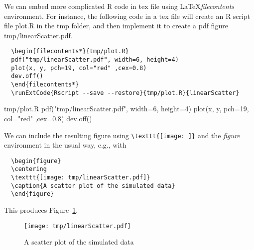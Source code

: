 \documentclass[12pt]{amsart}
\begin{document}
We can embed more complicated R code in tex file using \LaTeX\space \textit{filecontents} environment. %
For instance, the following code in a tex file will create an R script file plot.R in the tmp folder, and then implement it to create a pdf figure tmp/linearScatter.pdf.
\begin{verbatim}
  \begin{filecontents*}{tmp/plot.R}
  pdf("tmp/linearScatter.pdf", width=6, height=4)
  plot(x, y, pch=19, col="red" ,cex=0.8)
  dev.off()
  \end{filecontents*}
  \runExtCode{Rscript --save --restore}{tmp/plot.R}{linearScatter}
\end{verbatim}
  \begin{filecontents*}{tmp/plot.R}
  pdf("tmp/linearScatter.pdf", width=6, height=4)
  plot(x, y, pch=19, col="red" ,cex=0.8)
  dev.off()
  \end{filecontents*}
We can include the resulting figure using \verb|\texttt{[image: ]}| and the \textit{figure} environment in the usual way, e.g., with
\begin{verbatim}
  \begin{figure}
  \centering
  \texttt{[image: tmp/linearScatter.pdf]}
  \caption{A scatter plot of the simulated data}
  \end{figure}
\end{verbatim}
This produces Figure~\ref{fig:1}.

\begin{figure}[h]
\centering
\texttt{[image: tmp/linearScatter.pdf]}
\caption{A scatter plot of the simulated data}\label{fig:1}
\end{figure}





\end{document}

